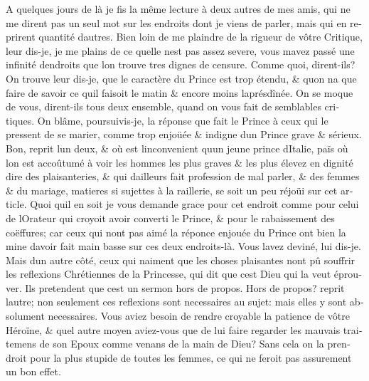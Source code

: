 \documentclass[14pt,a4paper]{memoir}
\begin{document}
\begin{otherlanguage}{french}
A quelques jours de là je fis la même lecture à deux autres de mes amis,
qui ne me dirent pas un seul mot sur les endroits dont je viens de
parler, mais qui en reprirent quantité d\textquotesingle autres. Bien
loin de me plaindre de la rigueur de vôtre Critique, leur dis-je, je me
plains de ce qu\textquotesingle elle n\textquotesingle est pas assez
severe, vous m\textquotesingle avez passé une infinité
d\textquotesingle endroits que l\textquotesingle on trouve tres dignes
de censure. Comme quoi, dirent-ils? On trouve leur dis-je, que le
caractère du Prince est trop étendu, \& qu\textquotesingle on
n\textquotesingle a que faire de savoir ce qu\textquotesingle il faisoit
le matin \& encore moins l\textquotesingle aprésdînée. On se moque de
vous, dirent-ils tous deux ensemble, quand on vous fait de semblables
critiques. On blâme, poursuivis-je, la réponse que fait le Prince à ceux
qui le pressent de se marier, comme trop enjoüée \& indigne
d\textquotesingle un Prince grave \& sérieux. Bon, reprit
l\textquotesingle un d\textquotesingle eux, \& où est
l\textquotesingle inconvenient qu\textquotesingle un jeune prince
d\textquotesingle Italie, païs où l\textquotesingle on est accoûtumé à
voir les hommes les plus graves \& les plus élevez en dignité dire des
plaisanteries, \& qui d\textquotesingle ailleurs fait profession de mal
parler, \& des femmes \& du mariage, matieres si sujettes à la
raillerie, se soit un peu réjoüi sur cet article. Quoi
qu\textquotesingle il en soit je vous demande grace pour cet endroit
comme pour celui de l\textquotesingle Orateur qui croyoit avoir converti
le Prince, \& pour le rabaissement des coëffures; car ceux qui
n\textquotesingle ont pas aimé la réponce enjouée du Prince ont bien la
mine d\textquotesingle avoir fait main basse sur ces deux endroits-là.
Vous l\textquotesingle avez deviné, lui dis-je. Mais
d\textquotesingle un autre côté, ceux qui n\textquotesingle aiment que
les choses plaisantes n\textquotesingle ont pû souffrir les reflexions
Chrétiennes de la Princesse, qui dit que c\textquotesingle est Dieu qui
la veut éprouver. Ils pretendent que c\textquotesingle est un sermon
hors de propos. Hors de propos? reprit l\textquotesingle autre; non
seulement ces reflexions sont necessaires au sujet: mais elles y sont
absolument necessaires. Vous aviez besoin de rendre croyable la patience
de vôtre Héroïne, \& quel autre moyen aviez-vous que de lui faire
regarder les mauvais traitemens de son Epoux comme venans de la main de
Dieu? Sans cela on la prendroit pour la plus stupide de toutes les
femmes, ce qui ne feroit pas assurement un bon effet.


\end{otherlanguage}
\end{document}
